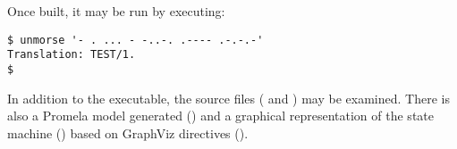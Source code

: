 Once built, it may be run by executing:

\begin{verbatim}
$ unmorse '- . ... - -..-. .---- .-.-.-'
Translation: TEST/1.
$
\end{verbatim}

In addition to the executable, the source files ( and
) may be examined.  There is also a Promela
model generated () and a graphical representation
of the state machine
(\href{Examples/unmorse/unmorseS.ps}{}) based on
GraphViz directives ().


